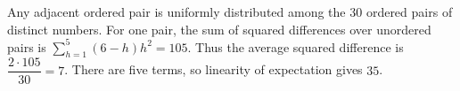 Any adjacent ordered pair is uniformly distributed among the $30$ ordered pairs of distinct numbers. For one pair, the sum of squared differences over unordered pairs is $\sum_{h=1}^5(6-h)h^2=105$. Thus the average squared difference is $\dfrac{2\cdot105}{30}=7$. There are five terms, so linearity of expectation gives $\boxed{35}$.
